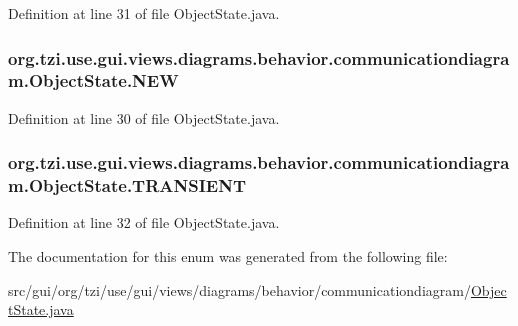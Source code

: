 Definition at line 31 of file Object\-State.\-java.

\hypertarget{enumorg_1_1tzi_1_1use_1_1gui_1_1views_1_1diagrams_1_1behavior_1_1communicationdiagram_1_1_object_state_a22f0869a4e0476b86be42f87580b81c7}{
\subsubsection[{N\-E\-W}]{\setlength{\rightskip}{0pt plus 5cm}org.\-tzi.\-use.\-gui.\-views.\-diagrams.\-behavior.\-communicationdiagram.\-Object\-State.\-N\-E\-W}}\label{enumorg_1_1tzi_1_1use_1_1gui_1_1views_1_1diagrams_1_1behavior_1_1communicationdiagram_1_1_object_state_a22f0869a4e0476b86be42f87580b81c7}


Definition at line 30 of file Object\-State.\-java.

\hypertarget{enumorg_1_1tzi_1_1use_1_1gui_1_1views_1_1diagrams_1_1behavior_1_1communicationdiagram_1_1_object_state_a5450f99f4f4d35054f57e7efda54a5ba}{
\subsubsection[{T\-R\-A\-N\-S\-I\-E\-N\-T}]{\setlength{\rightskip}{0pt plus 5cm}org.\-tzi.\-use.\-gui.\-views.\-diagrams.\-behavior.\-communicationdiagram.\-Object\-State.\-T\-R\-A\-N\-S\-I\-E\-N\-T}}\label{enumorg_1_1tzi_1_1use_1_1gui_1_1views_1_1diagrams_1_1behavior_1_1communicationdiagram_1_1_object_state_a5450f99f4f4d35054f57e7efda54a5ba}


Definition at line 32 of file Object\-State.\-java.



The documentation for this enum was generated from the following file\-:\begin{DoxyCompactItemize}
\item 
src/gui/org/tzi/use/gui/views/diagrams/behavior/communicationdiagram/\hyperlink{_object_state_8java}{Object\-State.\-java}\end{DoxyCompactItemize}
